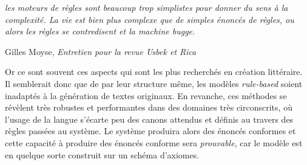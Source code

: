 \documentclass{article}
\newenvironment{citationbox}
{\begin{center}
		\begin{minipage}{.8\textwidth}
		}
		{
		\end{minipage}	
\end{center}
}
\begin{document}
			\begin{citationbox}
				\textit{les moteurs de règles sont beaucoup trop simplistes pour donner du sens à la complexité. La vie est bien plus complexe que de simples énoncés de règles, ou alors les règles se contredisent et la machine bugge.}
				\begin{flushright}
					Gilles Moyse, \textit{Entretien pour la revue Usbek et Rica} \autocite{edin2018}
				\end{flushright}
			\end{citationbox}
			
			
			Or ce sont souvent ces aspects qui sont les plus recherchés en création littéraire. Il semblerait donc que de par leur structure même, les modèles \textit{rule-based} soient inadaptés à la génération de textes originaux. En revanche, ces méthodes se révèlent très robustes et performantes dans des domaines très circonscrits, où l'usage de la langue s'écarte peu des canons attendus et définis au travers des règles passées au système. Le système produira alors des  énoncés conformes et cette capacité à produire des énoncés conforme sera \textit{prouvable}, car le modèle est en quelque sorte construit sur un schéma d'axiomes.\\
				
\end{document}
